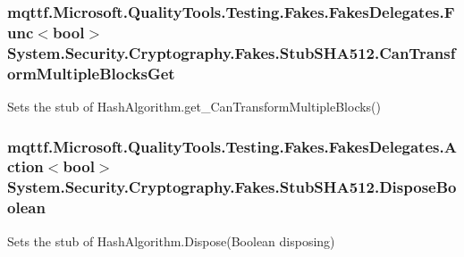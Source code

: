 \hypertarget{class_system_1_1_security_1_1_cryptography_1_1_fakes_1_1_stub_s_h_a512_ab48a84a09446b4e1bb802c2ec753a8ea}{
\subsubsection[{Can\-Transform\-Multiple\-Blocks\-Get}]{\setlength{\rightskip}{0pt plus 5cm}mqttf.\-Microsoft.\-Quality\-Tools.\-Testing.\-Fakes.\-Fakes\-Delegates.\-Func$<$bool$>$ System.\-Security.\-Cryptography.\-Fakes.\-Stub\-S\-H\-A512.\-Can\-Transform\-Multiple\-Blocks\-Get}}\label{class_system_1_1_security_1_1_cryptography_1_1_fakes_1_1_stub_s_h_a512_ab48a84a09446b4e1bb802c2ec753a8ea}


Sets the stub of Hash\-Algorithm.\-get\-\_\-\-Can\-Transform\-Multiple\-Blocks()

\hypertarget{class_system_1_1_security_1_1_cryptography_1_1_fakes_1_1_stub_s_h_a512_afd61c608edffde3662814234fa70471d}{
\subsubsection[{Dispose\-Boolean}]{\setlength{\rightskip}{0pt plus 5cm}mqttf.\-Microsoft.\-Quality\-Tools.\-Testing.\-Fakes.\-Fakes\-Delegates.\-Action$<$bool$>$ System.\-Security.\-Cryptography.\-Fakes.\-Stub\-S\-H\-A512.\-Dispose\-Boolean}}\label{class_system_1_1_security_1_1_cryptography_1_1_fakes_1_1_stub_s_h_a512_afd61c608edffde3662814234fa70471d}


Sets the stub of Hash\-Algorithm.\-Dispose(\-Boolean disposing)

